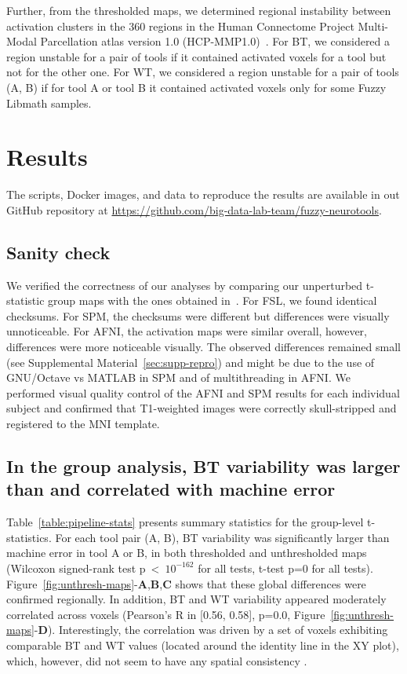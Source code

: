 \documentclass[11pt,onecolumn]{article}
\begin{document}
Further, from the thresholded maps, we determined regional instability
between activation clusters in the 360 regions in the Human Connectome
Project Multi-Modal Parcellation atlas version 1.0
(HCP-MMP1.0)~\cite{glasser2016multi}. For BT, we considered a region
unstable for a pair of tools if it contained activated voxels for a tool
but not for the other one. For WT, we considered a region unstable for a
pair of tools (A, B) if for tool A or tool B it contained activated voxels only for some Fuzzy Libmath
samples.

\section{Results}
The scripts, Docker images, and data to reproduce the results are available
in out GitHub repository at
\url{https://github.com/big-data-lab-team/fuzzy-neurotools}.


\subsection{Sanity check}

We verified the correctness of our analyses by comparing our unperturbed
t-statistic group maps with the ones obtained
in~\cite{bowring2019exploring}. For FSL, we found
identical checksums. For SPM, the checksums were different but differences
were visually unnoticeable. For AFNI, the activation maps were similar
overall, however, differences were more noticeable visually. 
The observed differences remained small (see Supplemental Material~\ref{sec:supp-repro}) and might be due to the use of
GNU/Octave vs MATLAB in SPM and of multithreading in AFNI. We performed visual quality control of the AFNI
and SPM results for each individual subject and confirmed that T1-weighted images were
correctly skull-stripped and registered to the MNI template.

\subsection{In the group analysis, BT variability was larger than and correlated with machine error}

Table~\ref{table:pipeline-stats} presents summary statistics for the
group-level t-statistics. For each tool pair (A, B), BT variability was
significantly larger than machine error in tool A or B, in both thresholded
and unthresholded maps (Wilcoxon signed-rank test p~\textless~$10^{-162}$
for all tests, t-test p=0 for all tests).
Figure~\ref{fig:unthresh-maps}-\textbf{A},\textbf{B},\textbf{C} shows that
these global differences were confirmed regionally. 
In addition, BT and WT variability appeared moderately correlated across voxels (Pearson's R
in [0.56, 0.58], p=0.0, Figure~\ref{fig:unthresh-maps}-\textbf{D}). Interestingly, the correlation 
was driven by a set of voxels exhibiting comparable BT and
WT values (located around the identity line in the XY plot), which, however, did not seem to have 
any spatial consistency .
\end{document}
